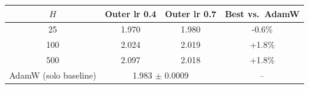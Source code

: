 \begin{tabular}{cccc}
\toprule
$H$ & Outer lr 0.4 & Outer lr 0.7 & Best vs.\ AdamW \\
\midrule
25 & 1.970 & 1.980 & -0.6\% \\
100 & 2.024 & 2.019 & +1.8\% \\
500 & 2.097 & 2.018 & +1.8\% \\
\midrule
AdamW (solo baseline) & \multicolumn{2}{c}{1.983 $\pm$ 0.0009} & -- \\
\bottomrule
\end{tabular}
